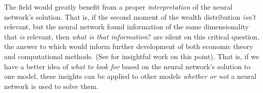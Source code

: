 \documentclass[11pt,pdftex,letterpaper]{article}
\begin{document}

\vspace{0.25cm}


The field would greatly benefit from a proper \textit{interpretation} of the neural network's solution. That is, if the second moment of the wealth distribution \textit{isn't} relevant, but the neural network found information of the same dimensionality that \textit{is} relevant, then \textit{what is that information}? \cite{MALIAR202176} are silent on this critical question, the answer to which would inform further development of both economic theory and computational methods.  (See \cite{Reiter2010} for insightful work on this point).  That is, if we have a better idea of \textit{what to look for} based on the neural network's solution to one model, these insights can be applied to other models \textit{whether or not} a neural network is used to solve them.
\end{document}
